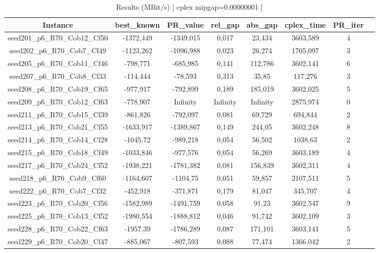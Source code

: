 \documentclass[a4paper]{article}
\begin{document}
\begin{center}
\begin{longtable}{cccccccc}
\caption{Results (MBit/s)   [ cplex mipgap=0.00000001 ]}
\tabularnewline
\hline
Instance & best\_known & PR\_value & rel\_gap & abs\_gap & cplex\_time & PR\_iter\\
\hline
seed201\_p6\_R70\_Cob12\_Cf50 & -1372,449 & -1349,015 & 0,017 & 23,434 & 3603,589 & 4\\
\hline
seed202\_p6\_R70\_Cob7\_Cf49 & -1123,262 & -1096,988 & 0,023 & 26,274 & 1705,097 & 3\\
\hline
seed205\_p6\_R70\_Cob11\_Cf46 & -798,771 & -685,985 & 0,141 & 112,786 & 3602,141 & 6\\
\hline
seed207\_p6\_R70\_Cob8\_Cf33 & -114,444 & -78,593 & 0,313 & 35,85 & 117,276 & 3\\
\hline
seed208\_p6\_R70\_Cob19\_Cf65 & -977,917 & -792,899 & 0,189 & 185,019 & 3602,025 & 5\\
\hline
seed209\_p6\_R70\_Cob12\_Cf63 & -778,907 & Infinity & Infinity & Infinity & 2875,974 & 0\\
\hline
seed211\_p6\_R70\_Cob15\_Cf39 & -861,826 & -792,097 & 0,081 & 69,729 & 694,844 & 2\\
\hline
seed213\_p6\_R70\_Cob21\_Cf55 & -1633,917 & -1389,867 & 0,149 & 244,05 & 3602,248 & 8\\
\hline
seed214\_p6\_R70\_Cob14\_Cf28 & -1045,72 & -989,218 & 0,054 & 56,502 & 1038,63 & 2\\
\hline
seed215\_p6\_R70\_Cob18\_Cf49 & -1033,846 & -977,576 & 0,054 & 56,269 & 3603,189 & 4\\
\hline
seed217\_p6\_R70\_Cob24\_Cf52 & -1938,221 & -1781,382 & 0,081 & 156,839 & 3602,311 & 4\\
\hline
seed218\_p6\_R70\_Cob9\_Cf60 & -1164,607 & -1104,75 & 0,051 & 59,857 & 2107,511 & 5\\
\hline
seed222\_p6\_R70\_Cob7\_Cf32 & -452,918 & -371,871 & 0,179 & 81,047 & 345,707 & 4\\
\hline
seed223\_p6\_R70\_Cob20\_Cf56 & -1582,989 & -1491,759 & 0,058 & 91,23 & 3602,547 & 9\\
\hline
seed225\_p6\_R70\_Cob13\_Cf52 & -1980,554 & -1888,812 & 0,046 & 91,742 & 3602,109 & 3\\
\hline
seed228\_p6\_R70\_Cob22\_Cf63 & -1957,39 & -1786,289 & 0,087 & 171,101 & 3603,141 & 5\\
\hline
seed229\_p6\_R70\_Cob20\_Cf47 & -885,067 & -807,593 & 0,088 & 77,474 & 1366,042 & 2\\

\end{longtable}
\end{center}
\end{document}

